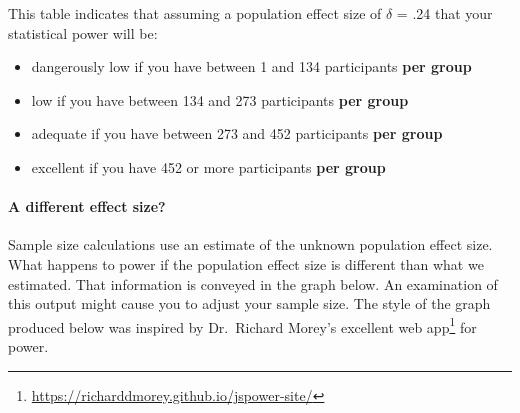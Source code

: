 \documentclass[
]{krantz}
\renewcommand{\href}[2]{#2\footnote{\url{#1}}}
\begin{document}
This table indicates that assuming a population effect size of \(\delta\) = .24 that your statistical power will be:

\begin{itemize}
\item
  dangerously low if you have between 1 and 134 participants \textbf{per group}
\item
  low if you have between 134 and 273 participants \textbf{per group}
\item
  adequate if you have between 273 and 452 participants \textbf{per group}
\item
  excellent if you have 452 or more participants \textbf{per group}
\end{itemize}

\hypertarget{a-different-effect-size}{%
\paragraph{A different effect size?}\label{a-different-effect-size}}

Sample size calculations use an estimate of the unknown population effect size. What happens to power if the population effect size is different than what we estimated. That information is conveyed in the graph below. An examination of this output might cause you to adjust your sample size. The style of the graph produced below was inspired by Dr.~Richard Morey's excellent \href{https://richarddmorey.github.io/jspower-site/}{web app} for power.
\end{document}
